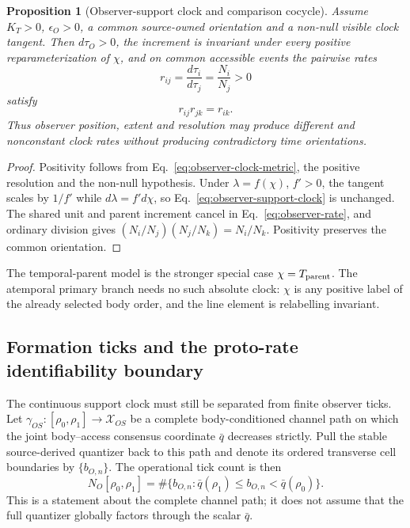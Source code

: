 \documentclass[11pt]{article}
\newtheorem{proposition}{Proposition}
\begin{document}
\begin{proposition}[Observer-support clock and comparison cocycle]
Assume $K_T>0$, $\epsilon_O>0$, a common source-owned orientation and a
non-null visible clock tangent. Then $d\tau_O>0$, the increment is invariant
under every positive reparameterization of $\chi$, and on common accessible
events the pairwise rates
\begin{equation}
 r_{ij}=\frac{d\tau_i}{d\tau_j}=\frac{N_i}{N_j}>0
 \label{eq:observer-rate}
\end{equation}
satisfy
\begin{equation}
 \boxed{r_{ij}r_{jk}=r_{ik}.}
 \label{eq:observer-cocycle}
\end{equation}
Thus observer position, extent and resolution may produce different and
nonconstant clock rates without producing contradictory time orientations.
\end{proposition}

\begin{proof}
Positivity follows from Eq.~\eqref{eq:observer-clock-metric}, the positive
resolution and the non-null hypothesis. Under
$\lambda=f(\chi)$, $f'>0$, the tangent scales by $1/f'$ while
$d\lambda=f'd\chi$, so Eq.~\eqref{eq:observer-support-clock} is unchanged.
The shared unit and parent increment cancel in Eq.~\eqref{eq:observer-rate},
and ordinary division gives
$(N_i/N_j)(N_j/N_k)=N_i/N_k$. Positivity preserves the common orientation.
\end{proof}

The temporal-parent model is the stronger special case
$\chi=T_{\rm parent}$. The atemporal primary branch needs no such absolute
clock: $\chi$ is any positive label of the already selected body order, and
the line element is relabelling invariant.

\subsection{Formation ticks and the proto-rate identifiability boundary}

The continuous support clock must still be separated from finite observer
ticks.  Let
\(
\gamma_{OS}:[\rho_0,\rho_1]\to\mathcal X_{OS}
\)
be a complete body-conditioned channel path on which the joint body--access
consensus coordinate \(\bar q\) decreases strictly.  Pull the stable source-derived
quantizer back to this path and denote its ordered transverse cell boundaries
by \(\{b_{O,n}\}\).  The operational tick count is then
\begin{equation}
 N_O[\rho_0,\rho_1]
 =\#\{b_{O,n}:\bar q(\rho_1)\le b_{O,n}<\bar q(\rho_0)\}.
 \label{eq:pathwise-tick-count}
\end{equation}
This is a statement about the complete channel path; it does not assume that
the full quantizer globally factors through the scalar \(\bar q\).
\end{document}

